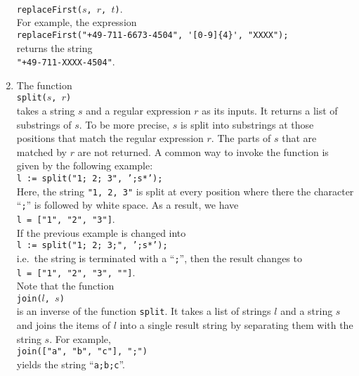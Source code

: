 \begin{enumerate}
      \\[0.2cm]
      \hspace*{1.3cm}
      \texttt{replaceFirst($s$, $r$, $t$)}.
      \\[0.2cm]
      For example, the expression
      \\[0.2cm]
      \hspace*{1.3cm}
      \verb|replaceFirst("+49-711-6673-4504", '[0-9]{4}', "XXXX");| 
      \\[0.2cm]
      returns the string
      \\[0.2cm]
      \hspace*{1.3cm}
      \verb|"+49-711-XXXX-4504"|.
\item The function
      \\[0.2cm]
      \hspace*{1.3cm}
      \texttt{split($s$, $r$)}
      \\[0.2cm]
      takes a string $s$ and a regular expression $r$ as its inputs.  It returns a list of
      substrings of $s$.  To be more precise, $s$ is split into substrings at those positions that
      match the regular expression $r$.  The parts of $s$ that are matched by $r$ are not returned.
      A common way to invoke the function is given by the following example:
      \\[0.2cm]
      \hspace*{1.3cm}
      \texttt{l := split("1; 2; 3", ';s*');}
      \\[0.2cm]
      Here, the string \texttt{"1, 2, 3"} is split at every position where there the character
      ``\texttt{;}'' is followed by white space.  As a result, we have
      \\[0.2cm]
      \hspace*{1.3cm}
      \texttt{l = ["1", "2", "3"]}.
      \\[0.2cm]
      If the previous example is changed into
      \\[0.2cm]
      \hspace*{1.3cm}
      \texttt{l := split("1; 2; 3;", ';s*');}
      \\[0.2cm]
      i.e.~the string is terminated with a ``\texttt{;}'', then the result changes to
      \\[0.2cm]
      \hspace*{1.3cm}
      \texttt{l = ["1", "2", "3", ""]}.
      \\[0.2cm]
      Note that the function 
      \\[0.2cm]
      \hspace*{1.3cm}
      \texttt{join($l$, $s$)}
      \\[0.2cm]
      is an inverse of the function \texttt{split}.  It takes a list of strings $l$ and a string $s$
      and joins the items of $l$ into a single result string by separating them with the string $s$.
      For example,
      \\[0.2cm]
      \hspace*{1.3cm}
      \texttt{join(["a", "b", "c"], ";")}
      \\[0.2cm]
      yields the string ``\texttt{a;b;c}''.
\end{enumerate}




